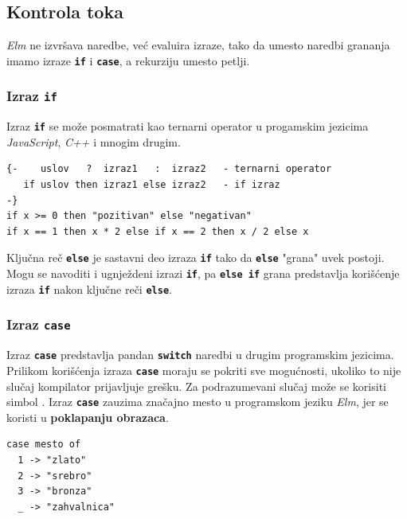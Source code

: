 \documentclass[12pt,oneside]{memoir}
\begin{document}
\subsection{Kontrola toka}
\emph{Elm} ne izvršava naredbe, već evaluira izraze, tako da umesto naredbi grananja
imamo izraze \texttt{\textbf{if}} i \texttt{\textbf{case}}, a rekurziju umesto petlji.  
\subsubsection{Izraz \texttt{\textbf{if}}}
Izraz \texttt{\textbf{if}} se može posmatrati kao ternarni operator u progamskim jezicima \emph{JavaScript}, \emph{C++} i 
mnogim drugim.
\begin{listing}[h]
\begin{verbatim}
{-    uslov   ?  izraz1   :  izraz2   - ternarni operator
   if uslov then izraz1 else izraz2   - if izraz
-}
if x >= 0 then "pozitivan" else "negativan"
if x == 1 then x * 2 else if x == 2 then x / 2 else x
\end{verbatim}
\caption{Sintaksa izraz \texttt{\textbf{if}} i primer upotrebe}
\label{listing:if}
\end{listing}

Ključna reč \texttt{\textbf{else}} je sastavni deo izraza \texttt{\textbf{if}} tako
da \texttt{\textbf{else}} "grana" uvek postoji. Mogu se navoditi i ugnježdeni
izrazi \texttt{\textbf{if}}, pa \texttt{\textbf{else if}} grana predstavlja korišćenje
izraza \texttt{\textbf{if}} nakon ključne reči \texttt{\textbf{else}}.

\subsubsection{Izraz \texttt{\textbf{case}}}
Izraz \texttt{\textbf{case}} predstavlja pandan \texttt{\textbf{switch}} naredbi u drugim
programskim jezicima. Prilikom korišćenja izraza \texttt{\textbf{case}} moraju se pokriti sve
mogućnosti, ukoliko to nije slučaj kompilator prijavljuje grešku. Za podrazumevani slučaj
može se korisiti simbol \texttt{\textbf{\textunderscore}}. Izraz \texttt{\textbf{case}}
zauzima značajno mesto u programskom jeziku \emph{Elm}, jer se koristi u \textbf{poklapanju obrazaca}.
\begin{listing}[h]
\begin{verbatim}
case mesto of
  1 -> "zlato"
  2 -> "srebro"
  3 -> "bronza"
  _ -> "zahvalnica"
\end{verbatim}
\caption{Primer upotrebe izraza \texttt{\textbf{case}}}
\label{listing:case}
\end{listing}
\end{document}
